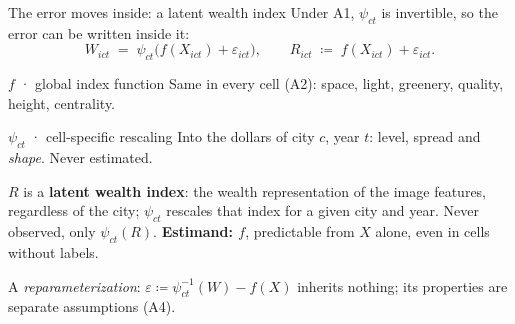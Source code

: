 \documentclass[10pt,aspectratio=169]{beamer}
\begin{document}
\begin{frame}{The error moves inside: a latent wealth index}
\setlength{\abovedisplayskip}{3pt}\setlength{\belowdisplayskip}{3pt}
\footnotesize Under A1, $\psi_{ct}$ is invertible, so the error can be written inside it:
\vspace{-0.4em}
\[
  W_{ict} \;=\; \psi_{ct}\big(f(X_{ict})+\varepsilon_{ict}\big),
  \qquad
  R_{ict} \;\coloneqq\; f(X_{ict})+\varepsilon_{ict}.
\]
\smallskip
\begin{minipage}[t]{0.485\textwidth}
\begin{tbox}[blue]{$f$ · global index function}
\scriptsize Same in every cell (A2): space, light, greenery, quality, height, centrality.
\end{tbox}
\end{minipage}\hfill
\begin{minipage}[t]{0.485\textwidth}
\begin{tbox}[blue]{$\psi_{ct}$ · cell-specific rescaling}
\scriptsize Into the dollars of city $c$, year $t$: level, spread and \emph{shape}. Never estimated.
\end{tbox}
\end{minipage}\par
\smallskip
\footnotesize $R$ is a \textbf{latent wealth index}: the wealth representation of the image features, regardless of the city; $\psi_{ct}$ rescales that index for a given city and year. Never observed, only $\psi_{ct}(R)$. \textbf{Estimand: $f$}, predictable from $X$ alone, even in cells without labels.
\pause
\begin{caveatbox}
\scriptsize A \emph{reparameterization}: $\varepsilon \coloneqq \psi_{ct}^{-1}(W)-f(X)$ inherits nothing; its properties are separate assumptions (A4).
\end{caveatbox}
\end{frame}
\end{document}
